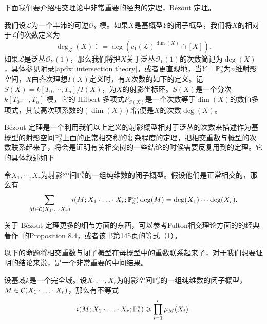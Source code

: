 下面我们要介绍相交理论中非常重要的经典的定理，B\'ezout 定理。

我们设$\mathscr{L}$为一个丰沛的可逆$\mathcal{O}_Y$-模。如果$X$是基概型$Y$的闭子概型，我们将$X$的相对于$\mathscr{L}$的次数定义为
\begin{equation}
\deg_{\mathscr{L}}(X) ：= \deg(c_1(\mathscr{L})^{\dim(X)}\cap[X]).
\end{equation}
如果$\mathscr{L}$是泛丛$\mathcal{O}_Y(1)$，那么我们将把$X$关于泛丛$\mathcal{O}_Y(1)$的次数简记为$\deg(X)$，具体参见附录\ref{apdx: intersection theory}。或者更直观地，当$Y = \mathbb P^n_k$为$n$维射影空间，$X$由齐次理想$I(X)$定义时，有$X$次数的如下的定义。记$S(X) = k[T_0,\cdots,T_n] / I(X)$，为$X$的射影坐标环。$S(X)$是一个分次$k[T_0,\cdots,T_n]$-模，它的 Hilbert 多项式$P_{S(X)}$是一个次数等于$\dim(X)$的数值多项式，其最高次项系数的$(\dim(X))!$倍便是$X$的次数$\deg(X)$。

B\'ezout 定理是一个利用我们以上定义的射影概型相对于泛丛的次数来描述作为基概型的射影空间$\mathbb P^n_k$上面的正常相交积的复杂程度的定理，把相交重数与概型的次数联系起来了，将会是证明有关相交树的一些结论的时候需要反复用到的定理。它的具体叙述如下

\begin{theorem}[B\'ezout 定理]
\label{bezout}
令$X_1,\cdots, X_r$为射影空间$\mathbb P^n_k$的一组纯维数的闭子概型。假设他们是正常相交的，那么有
\begin{equation} \label{eq: bezout}
\sum_{M\in\mathcal C(X_1\cdot\ldots\cdot X_r)}i(M;X_1\cdot\ldots\cdot X_r;\mathbb P^n_k)\deg(M)=\deg(X_1)\cdots\deg(X_r).
\end{equation}
\end{theorem}

关于 B\'ezout 定理更多的细节方面的东西，可以参考Fulton相交理论方面的的经典著作~的Proposition 8.4，或者该书第145页的等式（1）。

以下的命题将相交重数与闭子概型在母概型中的重数联系起来了，对于我们想要证明的结论来说，是一个非常重要的中间结果。

\begin{proposition} 
\label{relation of 2 kinds of multiplicities}
设基域$k$是一个完全域。设$X_1,\cdots, X_r$为射影空间$\mathbb P^n_k$的一组纯维数的闭子概型，$M\in \mathcal{C}(X_1\cdot\ldots\cdot X_r)$，那么有不等式
\begin{equation}
i(M;X_1\cdot\ldots\cdot X_r;\mathbb P^n_k) \geqslant \prod\limits_{i=1}^r \mu_M(X_i).
\end{equation}
\end{proposition}

